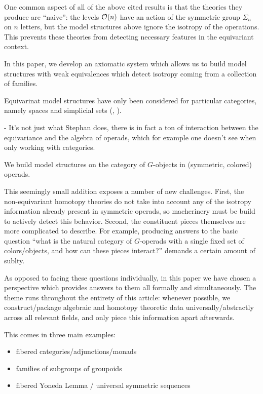 \documentclass[a4paper,10pt
]{article}%
\renewcommand{\1}{\eta}%
\begin{document}
One common aspect of all of the above cited results is that the theories they produce are ``naive'':
the levels $\mathcal{O}(n)$ have an action of the symmetric group $\Sigma_n$ on $n$ letters,
but the model structures above ignore the isotropy of the operations.
This prevents these theories from detecting necessary features in the equivariant context.




In this paper, we develop an axiomatic system which allows us to build model structures with
weak equivalences which detect isotropy coming from a collection of families.

Equivarinat model structures have only been considered for particular categories, namely spaces and simplicial sets (\cite[Thm. 3.1]{GW18}, \cite[Prop. 3.3.12]{Rez96}).

- It's not just what Stephan does, there is in fact a ton of interaction between the equivariance and the algebra of operads, which for example one doesn't see when only working with categories.



We build model structures on the category of $G$-objects in (symmetric, colored) operads.






This seemingly small addition exposes a number of new challenges.
%
First, the non-equivariant homotopy theories do not take into account any of the isotropy information already present in symmetric operads,
so macherinery must be build to actively detect this behavior.
%
Second, the constituent pieces themselves are more complicated to describe.
For example, producing answers to the basic question
``what is the natural category of $G$-operads with a single fixed set of colors/objects, and how can these pieces interact?''
demands a certain amount of sublty.

As opposed to facing these questions individually,
in this paper we have chosen a perspective which provides answers to them all formally and simultaneously.
The theme runs throughout the entirety of this article:
whenever possible, we construct/package algebraic and homotopy theoretic data universally/abstractly across all relevant fields, and only piece this information apart afterwards.

This comes in three main examples:
\begin{itemize}
	\item fibered categories/adjunctions/monads
	\item families of subgroups of groupoids
	\item fibered Yoneda Lemma / universal symmetric sequences
\end{itemize}
\end{document}
